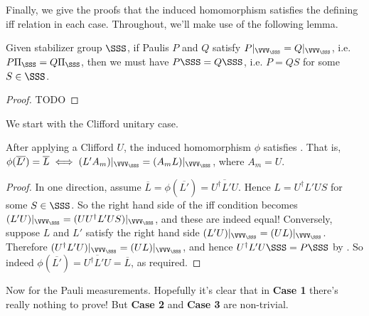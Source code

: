 Finally, we give the proofs that the induced homomorphism satisfies the defining iff relation  in each case.
Throughout, we'll make use of the following lemma.

\begin{lemma}\label{lem:paulis_equal_on_codespace_are_equal_up_to_stabilizer}
    Given stabilizer group $\SSS$, if Paulis $P$ and $Q$ satisfy $P|_{\VVV_\SSS} = Q|_{\VVV_{\SSS}}$, i.e. $P \Pi_{\SSS} = Q \Pi_\SSS$, then we must have $P\SSS = Q\SSS$, i.e. $P = QS$ for some $S \in \SSS$.
    \begin{proof}
        TODO
    \end{proof}
\end{lemma}

We start with the Clifford unitary case.

\begin{proposition}
    After applying a Clifford $U$, the induced homomorphism $\phi$ satisfies .
    That is, $\phi(\overline{L'}) = \overline{L} \iff (L' A_m)|_{\VVV_\SSS} = (A_m L)|_{\VVV_\SSS}$, where $A_m = U$.
    \begin{proof}
        In one direction, assume $\overline{L} = \phi(\overline{L'}) = \overline{U^\dagger L' U}$.
        Hence $L = U^\dagger L' U S$ for some $S \in \SSS$.
        So the right hand side of the iff condition becomes $(L' U)|_{\VVV_\SSS} = (U U^\dagger L' U S)|_{\VVV_\SSS}$, and these are indeed equal!
        Conversely, suppose $L$ and $L'$ satisfy the right hand side $(L' U)|_{\VVV_\SSS} = (U L)|_{\VVV_\SSS}$.
        Therefore $(U^\dagger L' U)|_{\VVV_\SSS} = (U L)|_{\VVV_\SSS}$,
        and hence $U^\dagger L' U \SSS = P \SSS$ by .
        So indeed $\phi(\overline{L'}) = \overline{U^\dagger L' U} = \overline{L}$, as required.
    \end{proof}
\end{proposition}

Now for the Pauli measurements.
Hopefully it's clear that in \textbf{Case 1} there's really nothing to prove!
But \textbf{Case 2} and \textbf{Case 3} are non-trivial.

